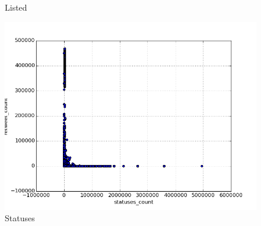 \begin{figure}[H]
    \caption{Listed}
\endminipage\hfill
{}
    \centering
    \includegraphics[width=\linewidth]{img/statuses_count.png}
    \caption{Statuses}
\endminipage\hfill
\end{figure}

